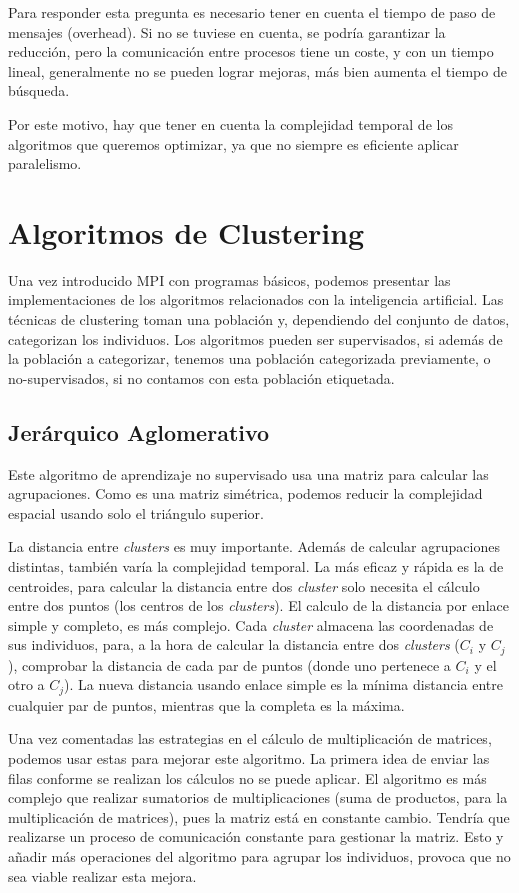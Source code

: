 	Para responder esta pregunta es necesario tener en cuenta el tiempo de paso de mensajes (overhead). Si no se tuviese en cuenta, se podría garantizar la reducción, pero la comunicación entre procesos tiene un coste, y con un tiempo lineal, generalmente no se pueden lograr mejoras, más bien aumenta el tiempo de búsqueda. 
	
	Por este motivo, hay que tener en cuenta la complejidad temporal de los algoritmos que queremos optimizar, ya que no siempre es eficiente aplicar paralelismo.


\section{Algoritmos de Clustering}

	Una vez introducido MPI con programas básicos, podemos presentar las implementaciones de los algoritmos relacionados con la inteligencia artificial. Las técnicas de clustering toman una población y, dependiendo del conjunto de datos, categorizan los individuos. Los algoritmos pueden ser supervisados, si además de la población a categorizar, tenemos una población categorizada previamente, o no-supervisados, si no contamos con esta población etiquetada.

	\subsection{Jerárquico Aglomerativo}
	\label{cap:3_2_1}
		Este algoritmo de aprendizaje no supervisado usa una matriz para calcular las agrupaciones. Como es una matriz simétrica, podemos reducir la complejidad espacial usando solo el triángulo superior. 
		
		La distancia entre \textit{clusters} es muy importante. Además de calcular agrupaciones distintas, también varía la complejidad temporal. La más eficaz y rápida es la de centroides, para calcular la distancia entre dos \textit{cluster} solo necesita el cálculo entre dos puntos (los centros de los \textit{clusters}). El calculo de la distancia por enlace simple y completo, es más complejo. Cada \textit{cluster} almacena las coordenadas de sus individuos, para, a la hora de calcular la distancia entre dos \textit{clusters} (\(C_{i}\) y \(C_{j}\)), comprobar la distancia de cada par de puntos (donde uno pertenece a \(C_{i}\) y el otro a \(C_{j}\)). La nueva distancia usando enlace simple es la mínima distancia entre cualquier par de puntos, mientras que la completa es la máxima.
		
	
		Una vez comentadas las estrategias en el cálculo de multiplicación de matrices, podemos usar estas para mejorar este algoritmo. La primera idea de enviar las filas conforme se realizan los cálculos no se puede aplicar. El algoritmo es más complejo que realizar sumatorios de multiplicaciones (suma de productos, para la multiplicación de matrices), pues la matriz está en constante cambio. Tendría que realizarse un proceso de comunicación constante para gestionar la matriz. Esto y añadir más operaciones del algoritmo para agrupar los individuos, provoca que no sea viable realizar esta mejora. 
		
